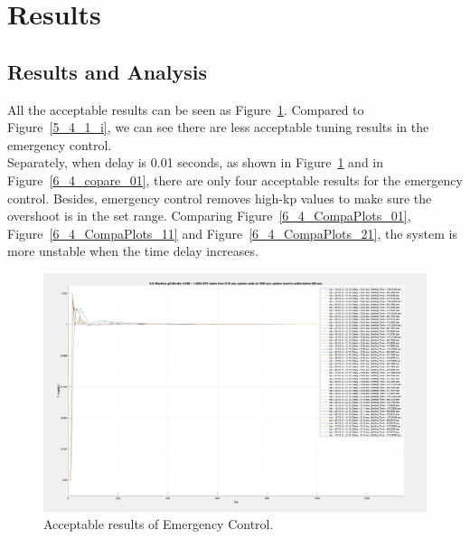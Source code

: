 \section{Results} %
\subsection{Results and Analysis} %

All the acceptable results can be seen as Figure~\ref{6_4_i}. Compared to Figure~\ref{5_4_1_i}, we can see there are less acceptable tuning results in the emergency control.\\

Separately, when delay is 0.01 seconds, as shown in Figure~\ref{6_4_i} and in Figure~\ref{6_4_copare_01}, there are only four acceptable results for the emergency control. Besides, emergency control removes high-kp values to make sure the overshoot is in the set range. Comparing Figure~\ref{6_4_CompaPlots_01}, Figure~\ref{6_4_CompaPlots_11} and Figure~\ref{6_4_CompaPlots_21}, the system is more unstable when the time delay increases.

\begin{figure}[htbp]
\centering
\includegraphics[width = .891\textwidth]{figure/6_4_i.png}
\caption{Acceptable results of Emergency Control.}
\label{6_4_i}
\end{figure}


